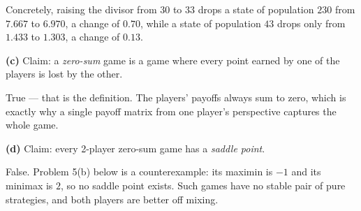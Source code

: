 \documentclass[12pt]{ximera}
\begin{document}
\begin{problem}
\begin{prompt}
\begin{feedback}
Concretely, raising the divisor from $30$ to $33$ drops a state of population $230$ from
$7.667$ to $6.970$, a change of $0.70$, while a state of population $43$ drops only from
$1.433$ to $1.303$, a change of $0.13$.
\end{feedback}
\end{prompt}

\begin{prompt}
\textbf{(c)} Claim: a \emph{zero-sum} game is a game where every point earned by one of
the players is lost by the other.

\begin{multipleChoice}
\end{multipleChoice}

\begin{feedback}
True --- that is the definition. The players' payoffs always sum to zero, which is
exactly why a single payoff matrix from one player's perspective captures the whole
game.
\end{feedback}
\end{prompt}

\begin{prompt}
\textbf{(d)} Claim: every 2-player zero-sum game has a \emph{saddle point}.

\begin{multipleChoice}
\end{multipleChoice}

\begin{feedback}
False. Problem 5(b) below is a counterexample: its maximin is $-1$ and its minimax is
$2$, so no saddle point exists. Such games have no stable pair of pure strategies, and
both players are better off mixing.
\end{feedback}
\end{prompt}
\end{problem}
\end{document}
